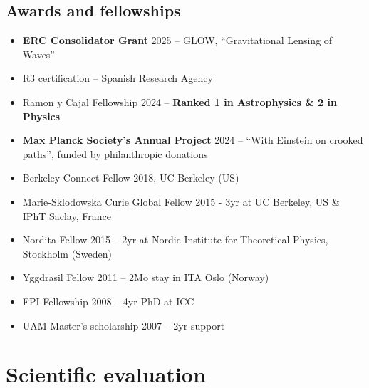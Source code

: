 \documentclass[11pt,a4paper]{article}
\begin{document}
\subsection*{Awards and fellowships}
\begin{itemize}\setlength{\itemsep}{1pt}
    \item \textbf{ERC Consolidator Grant} 2025 -- GLOW, ``Gravitational Lensing of Waves''
    \item R3 certification -- Spanish Research Agency
    \item Ramon y Cajal Fellowship 2024 -- \textbf{Ranked 1 in Astrophysics \& 2 in Physics} 
    \item \textbf{Max Planck Society's Annual Project} 2024 -- ``With Einstein on crooked paths'',
    funded by philanthropic donations
    \item Berkeley Connect Fellow 2018, UC Berkeley (US)
    \item Marie-Sklodowska Curie Global Fellow 2015 - 3yr at UC Berkeley, US \& IPhT Saclay, France
    \item Nordita Fellow 2015 -- 2yr at Nordic Institute for Theoretical Physics, Stockholm (Sweden) %
    \item Yggdrasil Fellow 2011 -- 2Mo stay in ITA Oslo (Norway) %
    \item FPI Fellowship 2008 -- 4yr PhD at ICC 
    \item UAM Master's scholarship 2007 -- 2yr support
\end{itemize}

\section*{Scientific evaluation}
\end{document}
